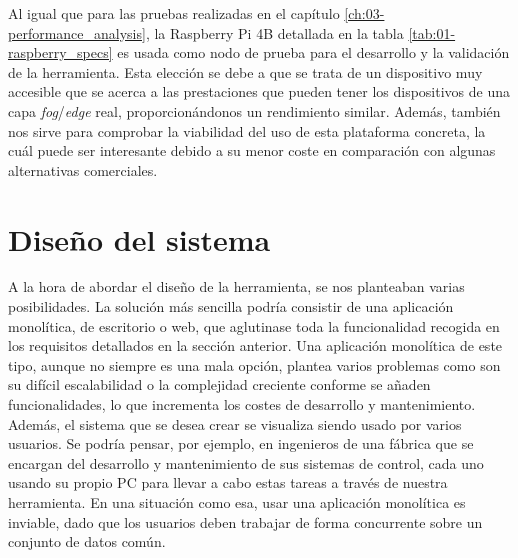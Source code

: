 Al igual que para las pruebas realizadas en el capítulo
\ref{ch:03-performance_analysis}, la Raspberry Pi 4B detallada en la tabla
\ref{tab:01-raspberry_specs} es usada como nodo de prueba para el desarrollo y
la validación de la herramienta. Esta elección se debe a que se trata de un
dispositivo muy accesible que se acerca a las prestaciones que pueden tener los
dispositivos de una capa \textit{fog}/\textit{edge} real, proporcionándonos un
rendimiento similar. Además, también nos sirve para comprobar la viabilidad del
uso de esta plataforma concreta, la cuál puede ser interesante debido a su menor
coste en comparación con algunas alternativas comerciales.

\section{Diseño del sistema}
\label{sec:04-system_design}

A la hora de abordar el diseño de la herramienta, se nos planteaban varias
posibilidades. La solución más sencilla podría consistir de una aplicación
monolítica, de escritorio o web, que aglutinase toda la funcionalidad recogida
en los requisitos detallados en la sección anterior. Una aplicación monolítica
de este tipo, aunque no siempre es una mala opción, plantea varios problemas
como son su difícil escalabilidad o la complejidad creciente conforme se añaden
funcionalidades, lo que incrementa los costes de desarrollo y mantenimiento.
Además, el sistema que se desea crear se visualiza siendo usado por varios
usuarios. Se podría pensar, por ejemplo, en ingenieros de una fábrica que se
encargan del desarrollo y mantenimiento de sus sistemas de control, cada uno
usando su propio PC para llevar a cabo estas tareas a través de nuestra
herramienta. En una situación como esa, usar una aplicación monolítica es
inviable, dado que los usuarios deben trabajar de forma concurrente sobre un
conjunto de datos común.

